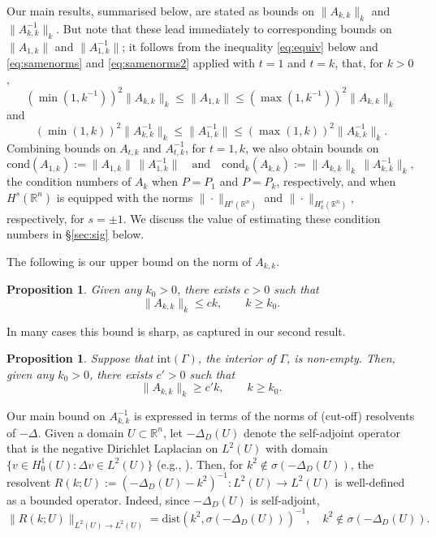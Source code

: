 \documentclass{birkjour}
\newtheorem{proposition}[theorem]{Proposition}
\theoremstyle{definition}
\theoremstyle{remark}
\numberwithin{equation}{section}
\newcommand{\R}{\mathbb{R}}
\newcommand{\spec}{\sigma}
\newcommand{\cond}{\mathrm{cond}}
\newcommand{\dist}{\mathrm{dist}}
\begin{document}
Our main results, summarised below, are stated as bounds on $\|A_{k,k}\|_k$ and $\|A_{k,k}^{-1}\|_k$. But note that these lead immediately to corresponding bounds on $\|A_{1,k}\|$ and $\|A_{1,k}^{-1}\|$; it follows from the inequality \eqref{eq:equiv} below and \eqref{eq:samenorms} and \eqref{eq:samenorms2} applied with $t=1$ and $t=k$, that, for $k>0$, 
\begin{equation} \label{eq:equiv2}
 (\min(1,k^{-1}))^2\|A_{k,k}\|_k\leq \|A_{1,k}\| \leq (\max(1,k^{-1}))^2\|A_{k,k}\|_k
\end{equation}
and
\begin{equation} \label{eq:equiv2a}
(\min(1,k))^2\|A^{-1}_{k,k}\|_k \leq\|A^{-1}_{1,k}\| \leq (\max(1,k))^2\|A^{-1}_{k,k}\|_k.
\end{equation}
Combining bounds on $A_{t,k}$ and $A_{t,k}^{-1}$, for $t=1,k$, we also obtain bounds on 
$$
\cond(A_{1,k}) := \|A_{1,k}\|\, \|A_{1,k}^{-1}\| \quad \mbox{and} \quad \cond_k(A_{k,k}) := \|A_{k,k}\|_k\, \|A_{k,k}^{-1}\|_k,
$$
the condition numbers of  $A_k$ when $P=P_1$ and $P=P_k$, respectively, and when $H^{s}(\R^n)$ is equipped with the norms $\|\cdot\|_{H^{s}(\R^n)}$ and $\|\cdot\|_{H_k^{s}(\R^n)}$, respectively, for $s=\pm 1$. We discuss the value of estimating these condition numbers in \S\ref{sec:sig} below.

The following is our upper bound on the norm of $A_{k,k}$.

\begin{proposition} \label{prop:Ak} 
Given any $k_0>0$, there exists $c>0$ such that
$$
\|A_{k,k}\|_k \leq ck, \qquad k\geq k_0.
$$
\end{proposition}

\noindent In many cases this bound is sharp, as captured in our second result.
\begin{proposition} \label{prop:Ak2} 
Suppose that $\mathrm{int}(\Gamma)$, the interior of $\Gamma$, is non-empty. Then, given any $k_0>0$, there exists $c'>0$ such that
$$
\|A_{k,k}\|_k \geq c'k, \qquad k\geq k_0.
$$
\end{proposition}

Our main bound on $A^{-1}_{k,k}$ is expressed in terms of the norms of (cut-off) resolvents of $-\Delta$. Given a domain $U\subset \R^n$, let $-\Delta_D(U)$ denote the self-adjoint operator that is the negative Dirichlet Laplacian on $L^2(U)$ with domain $\{v\in H_0^1(U):\Delta v \in L^2(U)\}$ (e.g., \cite[\S2.1.6]{levitin2023topics}). Then, for $k^2\not\in \spec(-\Delta_D(U))$, the resolvent $R(k;U):=  (-\Delta_D(U)-k^2)^{-1}:L^2(U)\to L^2(U)$ is well-defined as a bounded operator. Indeed, since $-\Delta_D(U)$ is self-adjoint, 
$$
\|R(k;U)\|_{L^2(U)\to L^2(U)}=\dist\left(k^2,\spec(-\Delta_D(U))\right)^{-1}, \quad k^2\not\in \spec(-\Delta_D(U)).
$$
\end{document}

